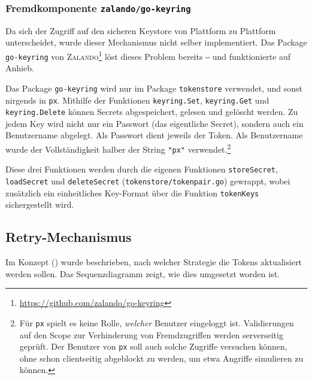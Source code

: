\subsubsection{Fremdkomponente \texttt{zalando/go-keyring}}
\label{sec:Go-Keyring}

Da sich der Zugriff auf den sicheren Keystore von Plattform zu Plattform unterscheidet, wurde dieser Mechanismus nicht selber implementiert. Das Package \texttt{go-keyring} von \textsc{Zalando}\footnote{\url{https://github.com/zalando/go-keyring}} löst dieses Problem bereits ‒ und funktionierte auf Anhieb.

Das Package \texttt{go-keyring} wird nur im Package \texttt{tokenstore} verwendet, und sonst nirgends in \texttt{px}. Mithilfe der Funktionen \texttt{keyring.Set}, \texttt{keyring.Get} und \texttt{keyring.Delete} können Secrets abgespeichert, gelesen und gelöscht werden. Zu jedem Key wird nicht nur ein Passwort (das eigentliche Secret), sondern auch ein Benutzername abgelegt. Als Passwort dient jeweils der Token. Als Benutzername wurde der Vollständigkeit halber der String \texttt{"px"} verwendet.\footnote{Für \texttt{px} spielt es keine Rolle, \textit{welcher} Benutzer eingeloggt ist. Validierungen auf den Scope zur Verhinderung von Fremdzugriffen werden serverseitig geprüft. Der Benutzer von \texttt{px} soll auch solche Zugriffe versuchen können, ohne schon clientseitig abgeblockt zu werden, um etwa Angriffe simulieren zu können.}

Diese drei Funktionen werden durch die eigenen Funktionen \texttt{storeSecret}, \texttt{loadSecret} und \texttt{deleteSecret} (\texttt{tokenstore/tokenpair.go}) gewrappt, wobei zusätzlich ein einheitliches Key-Format über die Funktion \texttt{tokenKeys} sichergestellt wird.

\subsection{Retry-Mechanismus}
\label{sec:Retry-Mechanismus}

Im Konzept () wurde beschrieben, nach welcher Strategie die Tokens aktualisiert werden sollen. Das Sequenzdiagramm  zeigt, wie dies umgesetzt worden ist.

